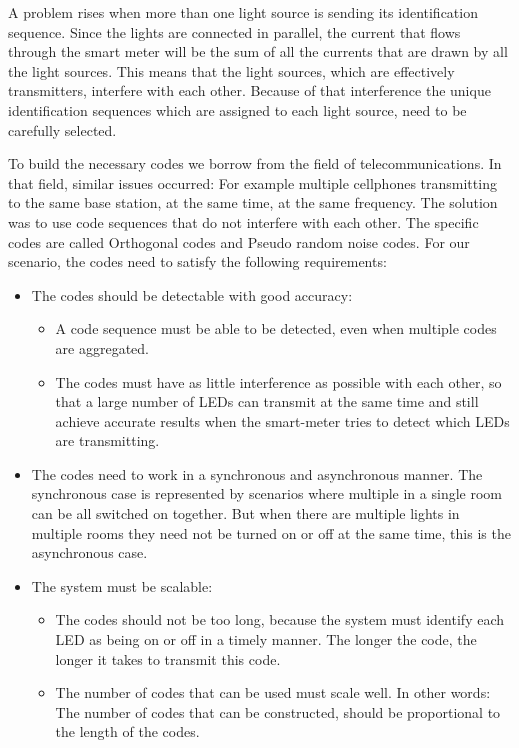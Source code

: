 	A problem rises when more than one light source is sending its identification sequence.
	Since the lights are connected in parallel, the current that flows through the smart meter will be the sum of all the currents that are drawn by all the light sources.
	This means that the light sources, which are effectively transmitters, interfere with each other.
	Because of that interference the unique identification sequences which are assigned to each light source, need to be carefully selected.


	To build the necessary codes we borrow from the field of telecommunications.
	In that field, similar issues occurred: For example multiple cellphones transmitting to the same base station, at the same time, at the same frequency. 
	The solution was to use code sequences that do not interfere with each other.
	The specific codes are called Orthogonal codes and Pseudo random noise codes.
	For our scenario, the codes need to satisfy the following requirements:
	\begin{itemize}

		\item The codes should be detectable with good accuracy:
		\begin{itemize}
			\item A code sequence must be able to be detected, even when multiple codes are aggregated.

			\item The codes must have as little interference as possible with each other, so that a large number of LEDs can transmit at the same time and still achieve accurate results when the smart-meter tries to detect which LEDs are transmitting.
		\end{itemize}


		\item The codes need to work in a synchronous and asynchronous manner. 
		The synchronous case is represented by scenarios where multiple in a single room can be all switched on together.
		But when there are multiple lights in multiple rooms they need not be turned on or off at the same time, this is the asynchronous case.

		\item The system must be scalable:
		\begin{itemize}
			\item The codes should not be too long, because the system must identify each LED as being on or off in a timely manner.
			The longer the code, the longer it takes to transmit this code.

			\item The number of codes that can be used must scale well.
			In other words: The number of codes that can be constructed, should be proportional to the length of the codes.  

		\end{itemize}

	\end{itemize}
	

